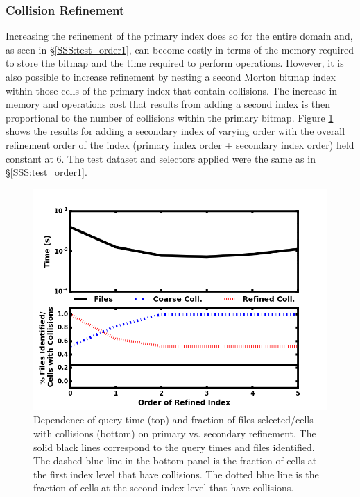\documentclass[apjl]{emulateapj}
\begin{document}
\subsubsection{Collision Refinement}\label{SSS:test_order2}
Increasing the refinement of the primary index does so for the entire domain and, as seen in \S\ref{SSS:test_order1}, can become costly in terms of the memory required to store the bitmap and the time required to perform operations. However, it is also possible to increase refinement by nesting a second Morton bitmap index within those cells of the primary index that contain collisions. The increase in memory and operations cost that results from adding a second index is then proportional to the number of collisions within the primary bitmap. Figure \ref{fig:test_order2} shows the results for adding a secondary index of varying order with the overall refinement order of the index (primary index order + secondary index order) held constant at 6. The test dataset and selectors applied were the same as in \S\ref{SSS:test_order1}.
%
\begin{figure}[htbp]
\begin{center}
\includegraphics[width=\columnwidth,keepaspectratio]{../images/vary_order2_np1024_nf512.png}
\caption{Dependence of query time (top) and fraction of files selected/cells with collisions (bottom) on primary vs. secondary refinement. The solid black lines correspond to the query times and files identified. The dashed blue line in the bottom panel is the fraction of cells at the first index level that have collisions. The dotted blue line is the fraction of cells at the second index level that have collisions.}
\label{fig:test_order2}
\end{center}
\end{figure}
%
\end{document}
